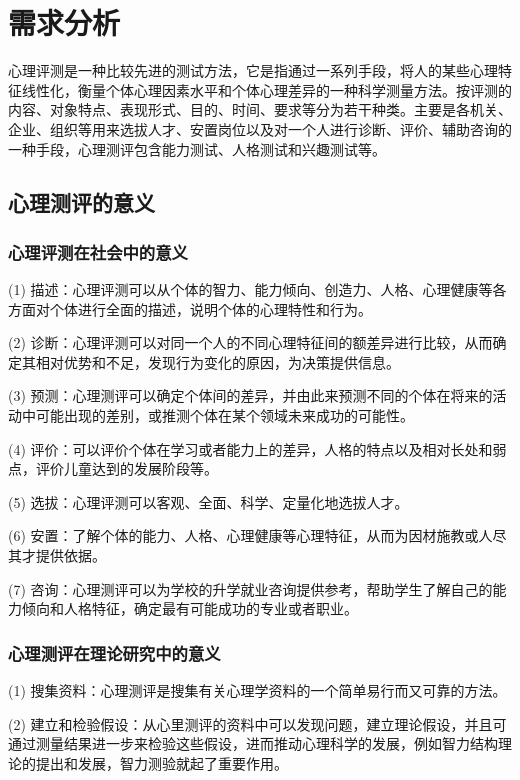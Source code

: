 \section{需求分析}

心理评测是一种比较先进的测试方法，它是指通过一系列手段，将人的某些心理特征线性化，衡量个体心理因素水平和个体心理差异的一种科学测量方法。按评测的内容、对象特点、表现形式、目的、时间、要求等分为若干种类。主要是各机关、企业、组织等用来选拔人才、安置岗位以及对一个人进行诊断、评价、辅助咨询的一种手段，心理测评包含能力测试、人格测试和兴趣测试等。

\subsection{心理测评的意义}

\subsubsection{心理评测在社会中的意义}

(1) 描述：心理评测可以从个体的智力、能力倾向、创造力、人格、心理健康等各方面对个体进行全面的描述，说明个体的心理特性和行为。

(2) 诊断：心理评测可以对同一个人的不同心理特征间的额差异进行比较，从而确定其相对优势和不足，发现行为变化的原因，为决策提供信息。 

(3) 预测：心理测评可以确定个体间的差异，并由此来预测不同的个体在将来的活动中可能出现的差别，或推测个体在某个领域未来成功的可能性。 

(4) 评价：可以评价个体在学习或者能力上的差异，人格的特点以及相对长处和弱点，评价儿童达到的发展阶段等。 

(5) 选拔：心理评测可以客观、全面、科学、定量化地选拔人才。 

(6) 安置：了解个体的能力、人格、心理健康等心理特征，从而为因材施教或人尽其才提供依据。 

(7) 咨询：心理测评可以为学校的升学就业咨询提供参考，帮助学生了解自己的能力倾向和人格特征，确定最有可能成功的专业或者职业。 

\subsubsection{心理测评在理论研究中的意义}

(1) 搜集资料：心理测评是搜集有关心理学资料的一个简单易行而又可靠的方法。

(2) 建立和检验假设：从心里测评的资料中可以发现问题，建立理论假设，并且可通过测量结果进一步来检验这些假设，进而推动心理科学的发展，例如智力结构理论的提出和发展，智力测验就起了重要作用。

